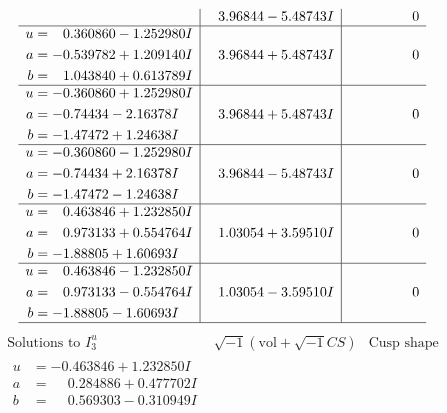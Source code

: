 \documentclass[1p]{elsarticle_modified}
\theoremstyle{definition}
\newcommand{\I}{\sqrt{-1}}
\begin{document}
$$\begin{array}{c|c|c}
 & \phantom{-}3.96844 - 5.48743 I & \phantom{-0.000000 } 0 \\ \hline\begin{aligned}
u &= \phantom{-}0.360860 - 1.252980 I \\
a &= -0.539782 + 1.209140 I \\
b &= \phantom{-}1.043840 + 0.613789 I\end{aligned}
 & \phantom{-}3.96844 + 5.48743 I & \phantom{-0.000000 } 0 \\ \hline\begin{aligned}
u &= -0.360860 + 1.252980 I \\
a &= -0.74434 - 2.16378 I \\
b &= -1.47472 + 1.24638 I\end{aligned}
 & \phantom{-}3.96844 + 5.48743 I & \phantom{-0.000000 } 0 \\ \hline\begin{aligned}
u &= -0.360860 - 1.252980 I \\
a &= -0.74434 + 2.16378 I \\
b &= -1.47472 - 1.24638 I\end{aligned}
 & \phantom{-}3.96844 - 5.48743 I & \phantom{-0.000000 } 0 \\ \hline\begin{aligned}
u &= \phantom{-}0.463846 + 1.232850 I \\
a &= \phantom{-}0.973133 + 0.554764 I \\
b &= -1.88805 + 1.60693 I\end{aligned}
 & \phantom{-}1.03054 + 3.59510 I & \phantom{-0.000000 } 0 \\ \hline\begin{aligned}
u &= \phantom{-}0.463846 - 1.232850 I \\
a &= \phantom{-}0.973133 - 0.554764 I \\
b &= -1.88805 - 1.60693 I\end{aligned}
 & \phantom{-}1.03054 - 3.59510 I & \phantom{-0.000000 } 0\\
 \hline 
 \end{array}$$\newpage$$\begin{array}{c|c|c}  
\text{Solutions to }I^u_{3}& \I (\text{vol} + \sqrt{-1}CS) & \text{Cusp shape}\\
 \hline 
\begin{aligned}
u &= -0.463846 + 1.232850 I \\
a &= \phantom{-}0.284886 + 0.477702 I \\
b &= \phantom{-}0.569303 - 0.310949 I\end{aligned}

\end{array}$$
\end{document}
